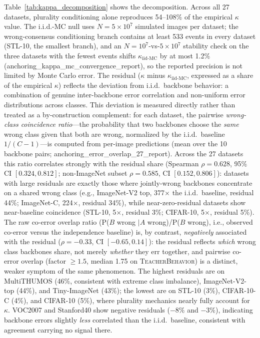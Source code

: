 \documentclass[a4paper,fleqn]{cas-sc}
\newcommand{\tb}{\textsc{TeacherBehavior}}
\begin{document}
Table~\ref{tab:kappa_decomposition} shows the decomposition.
Across all 27 datasets, plurality conditioning alone reproduces 54--108\% of the empirical $\kappa$ value. The i.i.d.-MC null uses $N{=}5\times 10^7$ simulated images per dataset; the wrong-consensus conditioning branch contains at least 533 events in every dataset (STL-10, the smallest branch), and an $N{=}10^7$-vs-$5\times 10^7$ stability check on the three datasets with the fewest events shifts $\kappa_{\text{iid-MC}}$ by at most 1.2\% (anchoring\_kappa\_mc\_convergence\_report), so the reported precision is not limited by Monte Carlo error.
The residual ($\kappa$ minus $\kappa_{\text{iid-MC}}$, expressed as a share of the empirical $\kappa$) reflects the deviation from i.i.d.\ backbone behavior: a combination of genuine inter-backbone error correlation and non-uniform error distributions across classes.
This deviation is measured directly rather than treated as a by-construction complement: for each dataset, the pairwise \emph{wrong-class coincidence ratio}---the probability that two backbones choose the \emph{same} wrong class given that both are wrong, normalized by the i.i.d.\ baseline $1/(C-1)$---is computed from per-image predictions (mean over the 10 backbone pairs; anchoring\_error\_overlap\_27\_report).
Across the 27 datasets this ratio correlates strongly with the residual share (Spearman $\rho = 0.628$, 95\% CI $[0.324, 0.812]$; non-ImageNet subset $\rho = 0.585$, CI $[0.152, 0.806]$): datasets with large residuals are exactly those where jointly-wrong backbones concentrate on a shared wrong class (e.g., ImageNet-V2 top, 377$\times$ the i.i.d.\ baseline, residual 44\%; ImageNet-C, 224$\times$, residual 34\%), while near-zero-residual datasets show near-baseline coincidence (STL-10, 5$\times$, residual 3\%; CIFAR-10, 5$\times$, residual 5\%).
The raw co-error overlap ratio (P($B$ wrong $\mid A$ wrong)/P($B$ wrong), i.e., observed co-error versus the independence baseline) is, by contrast, \emph{negatively} associated with the residual ($\rho = -0.33$, CI $[-0.65, 0.14]$): the residual reflects \emph{which} wrong class backbones share, not merely \emph{whether} they err together, and pairwise co-error overlap (factor $\ge 1.5$, median 1.75 on \tb) is a distinct, weaker symptom of the same phenomenon.
The highest residuals are on MultiTHUMOS (46\%, consistent with extreme class imbalance), ImageNet-V2-top (44\%), and Tiny-ImageNet (43\%); the lowest are on STL-10 (3\%), CIFAR-10-C (4\%), and CIFAR-10 (5\%), where plurality mechanics nearly fully account for $\kappa$.
VOC2007 and Stanford40 show negative residuals ($-8\%$ and $-3\%$), indicating backbone errors slightly \emph{less} correlated than the i.i.d.\ baseline, consistent with agreement carrying no signal there.
\end{document}
